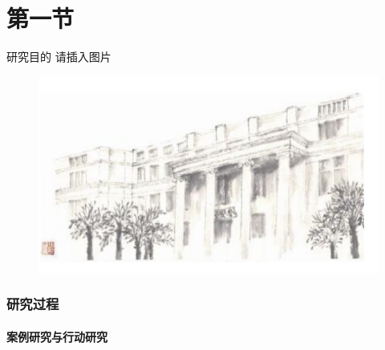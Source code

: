 \documentclass[serif]{beamer}
\begin{document}
   \part{第一节}
   \begin{frame}{研究目的}
     \partpage
      请插入图片
     \begin{figure}[b]
        \raggedleft
        \includegraphics[scale=0.4]{WSbuilding.pdf}	
        \caption{}
     \end{figure}
   \end{frame}
    \section{研究过程}
    \subsection{案例研究与行动研究}
\end{document}
